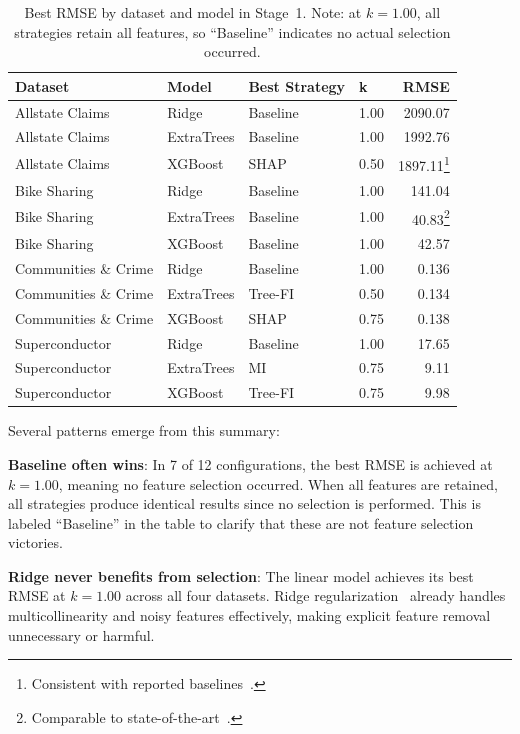 \begin{table}[ht!]
\centering
\caption{Best RMSE by dataset and model in Stage~1. Note: at $k=1.00$, all strategies retain all features, so ``Baseline'' indicates no actual selection occurred.}
\label{tab:stage1_best}
\begin{tabular}{llllr}
\toprule
\textbf{Dataset} & \textbf{Model} & \textbf{Best Strategy} & \textbf{k} & \textbf{RMSE} \\
\midrule
Allstate Claims & Ridge & Baseline & 1.00 & 2090.07 \\
Allstate Claims & ExtraTrees & Baseline & 1.00 & 1992.76 \\
Allstate Claims & XGBoost & SHAP & 0.50 & 1897.11\footnote{Consistent with reported baselines~\cite{gaurallstate}.} \\
\midrule
Bike Sharing & Ridge & Baseline & 1.00 & 141.04 \\
Bike Sharing & ExtraTrees & Baseline & 1.00 & 40.83\footnote{Comparable to state-of-the-art~\cite{wang2016random}.} \\
Bike Sharing & XGBoost & Baseline & 1.00 & 42.57 \\
\midrule
Communities \& Crime & Ridge & Baseline & 1.00 & 0.136 \\
Communities \& Crime & ExtraTrees & Tree-FI & 0.50 & 0.134 \\
Communities \& Crime & XGBoost & SHAP & 0.75 & 0.138 \\
\midrule
Superconductor & Ridge & Baseline & 1.00 & 17.65 \\
Superconductor & ExtraTrees & MI & 0.75 & 9.11 \\
Superconductor & XGBoost & Tree-FI & 0.75 & 9.98 \\
\bottomrule
\end{tabular}
\end{table}

Several patterns emerge from this summary:

\textbf{Baseline often wins}: In 7 of 12 configurations, the best RMSE is achieved at $k=1.00$, meaning no feature selection occurred. When all features are retained, all strategies produce identical results since no selection is performed. This is labeled ``Baseline'' in the table to clarify that these are not feature selection victories.

\textbf{Ridge never benefits from selection}: The linear model achieves its best RMSE at $k=1.00$ across all four datasets. Ridge regularization~\cite{hoerl1970ridge} already handles multicollinearity and noisy features effectively, making explicit feature removal unnecessary or harmful.

